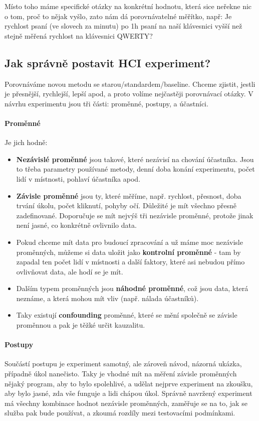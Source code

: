Místo toho máme specifické otázky na konkrétní hodnotu, která sice neřekne nic o tom, proč to nějak vyšlo, zato nám dá porovnávatelné měřítko, např: Je rychlost psaní (ve slovech za minutu) po 1h psaní na naší klávesnici vyšší než stejně měřená rychlost na klávesnici QWERTY?

\subsection{Jak správně postavit HCI experiment?}

Porovnáváme novou metodu se starou/standardem/baseline. Chceme zjistit, jestli je přesnější, rychlejší, lepší apod, a proto volíme nejčastěji porovnávací otázky. V návrhu experimentu jsou tři části: proměnné, postupy, a účastníci.

\paragraph{Proměnné} Je jich hodně:
\begin{itemize}
\item \textbf{Nezávislé proměnné} jsou takové, které nezávisí na chování účastníka. Jsou to třeba parametry používané metody, denní doba konání experimentu, počet lidí v místnosti, pohlaví účastníka apod.
\item \textbf{Závisle proměnné} jsou ty, které měříme, např. rychlost, přesnost, doba trvání úkolu, počet kliknutí, pohyby očí. Důležité je mít všechno přesně zadefinované. Doporučuje se mít nejvýš tři nezávisle proměnné, protože jinak není jasné, co konkrétně ovlivnilo data.
\item Pokud chceme mít data pro budoucí zpracování a už máme moc nezávisle proměnných, můžeme si data uložit jako \textbf{kontrolní proměnné} - tam by zapadal ten počet lidí v místnosti a další faktory, které asi nebudou přímo ovlivňovat data, ale hodí se je mít.
\item Dalším typem proměnných jsou \textbf{náhodné proměnné}, což jsou data, která neznáme, a která mohou mít vliv (např. nálada účastníků).
\item Taky existují \textbf{confounding} proměnné, které se mění společně se závisle proměnnou a pak je těžké určit kauzalitu.

\end{itemize}

\paragraph{Postupy} Součástí postupu je experiment samotný, ale zároveň návod, názorná ukázka, případně úkol nanečisto. Taky je vhodné mít na měření závisle proměnných nějaký program, aby to bylo spolehlivé, a udělat nejprve experiment na zkoušku, aby bylo jasné, zda vše funguje a lidi chápou úkol. Správně navržený experiment má všechny kombinace hodnot nezávisle proměnných, zaměřuje se na to, jak se služba pak bude používat, a zkoumá rozdíly mezi testovacími podmínkami.

